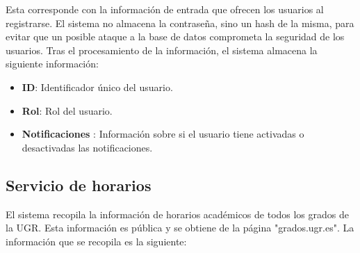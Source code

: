 Esta corresponde con la información de entrada que ofrecen los usuarios al registrarse. El sistema no almacena la contraseña, sino un hash de la misma, para evitar que un posible ataque a la base de datos comprometa la seguridad de los usuarios.
Tras el procesamiento de la información, el sistema almacena la siguiente información:

\begin{itemize}
    \item \textbf{ID}: Identificador único del usuario.
    \item \textbf{Rol}: Rol del usuario.
    \item \textbf{Notificaciones} : Información sobre si el usuario tiene activadas o desactivadas las notificaciones.
\end{itemize}

\subsection{Servicio de horarios}
El sistema recopila la información de horarios académicos de todos los grados de la UGR. Esta información es pública y se obtiene de la página "grados.ugr.es". La información que se recopila es la siguiente:

